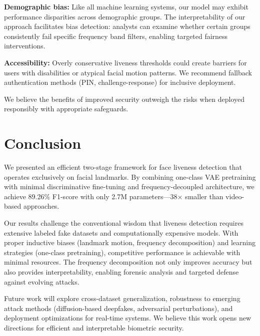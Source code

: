 \documentclass[11pt,twocolumn]{article}
\begin{document}
\textbf{Demographic bias:} Like all machine learning systems, our model may exhibit performance disparities across demographic groups. The interpretability of our approach facilitates bias detection: analysts can examine whether certain groups consistently fail specific frequency band filters, enabling targeted fairness interventions.

\textbf{Accessibility:} Overly conservative liveness thresholds could create barriers for users with disabilities or atypical facial motion patterns. We recommend fallback authentication methods (PIN, challenge-response) for inclusive deployment.

We believe the benefits of improved security outweigh the risks when deployed responsibly with appropriate safeguards.

\section{Conclusion}

We presented an efficient two-stage framework for face liveness detection that operates exclusively on facial landmarks. By combining one-class VAE pretraining with minimal discriminative fine-tuning and frequency-decoupled architecture, we achieve 89.26\% F1-score with only 2.7M parameters—38$\times$ smaller than video-based approaches.

Our results challenge the conventional wisdom that liveness detection requires extensive labeled fake datasets and computationally expensive models. With proper inductive biases (landmark motion, frequency decomposition) and learning strategies (one-class pretraining), competitive performance is achievable with minimal resources. The frequency decomposition not only improves accuracy but also provides interpretability, enabling forensic analysis and targeted defense against evolving attacks.

Future work will explore cross-dataset generalization, robustness to emerging attack methods (diffusion-based deepfakes, adversarial perturbations), and deployment optimizations for real-time systems. We believe this work opens new directions for efficient and interpretable biometric security.



\end{document}
